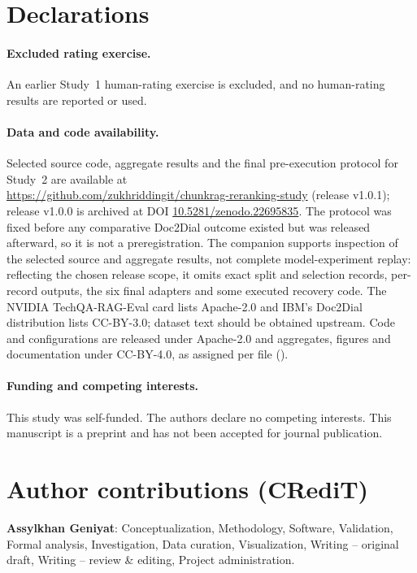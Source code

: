 \section*{Declarations}
\paragraph{Excluded rating exercise.} An earlier Study~1 human-rating exercise is excluded, and no human-rating results are reported or used.
\paragraph{Data and code availability.} Selected source code, aggregate results and the final pre-execution protocol for Study~2 are available at\\\url{https://github.com/zukhriddingit/chunkrag-reranking-study} (release v1.0.1);\\release v1.0.0 is archived at DOI \href{https://doi.org/10.5281/zenodo.22695835}{\mbox{10.5281/zenodo.22695835}}. The protocol was fixed before any comparative Doc2Dial outcome existed but was released afterward, so it is not a preregistration. The companion supports inspection of the selected source and aggregate results, not complete model-experiment replay: reflecting the chosen release scope, it omits exact split and selection records, per-record outputs, the six final adapters and some executed recovery code. The NVIDIA TechQA-RAG-Eval card lists Apache-2.0 and IBM's Doc2Dial distribution lists CC-BY-3.0; dataset text should be obtained upstream. Code and configurations are released under Apache-2.0 and aggregates, figures and documentation under CC-BY-4.0, as assigned per file ().
\paragraph{Funding and competing interests.} This study was self-funded. The authors declare no competing interests. This manuscript is a preprint and has not been accepted for journal publication.
\section*{Author contributions (CRediT)}
\noindent\textbf{Assylkhan Geniyat}: Conceptualization, Methodology, Software, Validation, Formal analysis, Investigation, Data curation, Visualization, Writing -- original draft, Writing -- review \& editing, Project administration.

